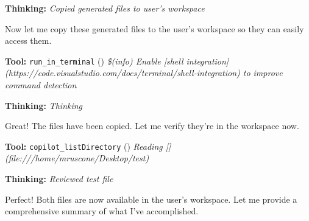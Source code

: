 \documentclass[11pt,a4paper]{article}
\begin{document}
\begin{thinkbox}
\textbf{Thinking:} \textit{Copied generated files to user's workspace}

Now let me copy these generated files to the user's workspace so they can easily access them.

\end{thinkbox}
\begin{toolokbox}
\textbf{Tool:} \texttt{run\_in\_terminal} (\checkmark)
\textit{\$(info) Enable [shell integration](https://code.visualstudio.com/docs/terminal/shell-integration) to improve command detection}
\end{toolokbox}
\begin{thinkbox}
\textbf{Thinking:} \textit{Thinking}

Great! The files have been copied. Let me verify they're in the workspace now.

\end{thinkbox}
\begin{toolokbox}
\textbf{Tool:} \texttt{copilot\_listDirectory} (\checkmark)
\textit{Reading [](file:///home/mruscone/Desktop/test)}
\end{toolokbox}
\begin{thinkbox}
\textbf{Thinking:} \textit{Reviewed test file}

Perfect! Both files are now available in the user's workspace. Let me provide a comprehensive summary of what I've accomplished.

\end{thinkbox}
\end{document}
